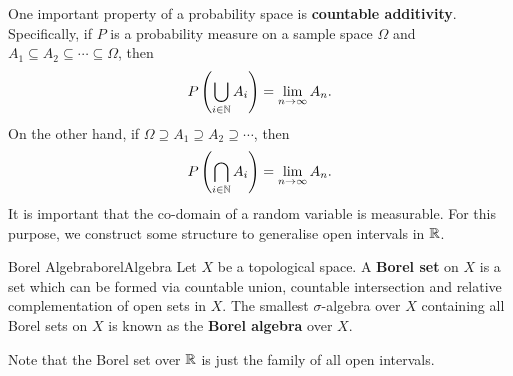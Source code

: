 \documentclass[math, code]{amznotes}
\theoremstyle{remark}
\begin{document}
One important property of a probability space is \textbf{countable additivity}. Specifically, if $P$ is a probability measure on a sample space $\Omega$ and $A_1 \subseteq A_2 \subseteq \cdots \subseteq \Omega$, then 
\begin{equation*}
    P\left(\bigcup_{i \in \mathbb{N}}A_i\right) = \lim_{n \to \infty}A_n.
\end{equation*}
On the other hand, if $\Omega \supseteq A_1 \supseteq A_2 \supseteq \cdots$, then 
\begin{equation*}
    P\left(\bigcap_{i \in \mathbb{N}}A_i\right) = \lim_{n \to \infty}A_n.
\end{equation*}
It is important that the co-domain of a random variable is measurable. For this purpose, we construct some structure to generalise open intervals in $\mathbb{R}$.
\begin{dfnbox}{Borel Algebra}{borelAlgebra}
    Let $X$ be a topological space. A {\color{red} \textbf{Borel set}} on $X$ is a set which can be formed via countable union, countable intersection and relative complementation of open sets in $X$. The smallest $\sigma$-algebra over $X$ containing all Borel sets on $X$ is known as the {\color{red} \textbf{Borel algebra}} over $X$.
\end{dfnbox}
Note that the Borel set over $\mathbb{R}$ is just the family of all open intervals. 
\end{document}
